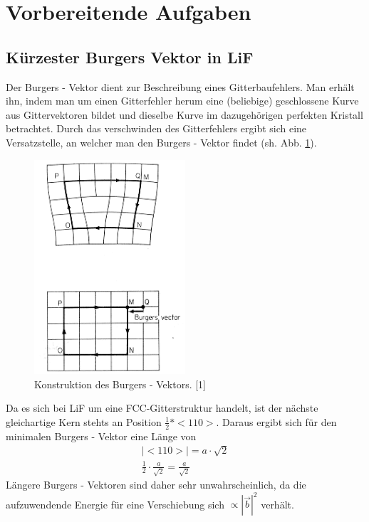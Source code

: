 ﻿\section{Vorbereitende Aufgaben}
    \subsection{Kürzester Burgers Vektor in LiF}
	Der Burgers - Vektor dient zur Beschreibung eines Gitterbaufehlers. Man erhält ihn, indem man um einen Gitterfehler herum eine (beliebige) geschlossene Kurve aus
	Gittervektoren bildet und dieselbe Kurve im dazugehörigen perfekten Kristall betrachtet. Durch das verschwinden des Gitterfehlers ergibt sich eine Versatzstelle,
	an welcher man den Burgers - Vektor findet (sh. Abb. \ref{FigBurger}).
	
	\begin{figure}[H]
            \centering
            \includegraphics[width=0.5\textwidth]{Images/Burger.PNG}
            \caption{Konstruktion des Burgers - Vektors. [1]}
            \label{FigBurger}
        \end{figure}

        Da es sich bei LiF um eine FCC-Gitterstruktur handelt, ist der nächste gleichartige Kern stehts an Position $\frac{1}{2} * <110>$. Daraus ergibt sich für den minimalen
        Burgers - Vektor eine Länge von
        \begin{align}
            |<110>| = a \cdot \sqrt{2} \\
            \frac{1}{2} \cdot \frac{a}{\sqrt{2}} = \frac{a}{\sqrt{2}}
        \end{align}
        Längere Burgers - Vektoren sind daher sehr unwahrscheinlich, da die aufzuwendende Energie für eine Verschiebung sich $\propto |\vec{b}|^2$ verhält.


